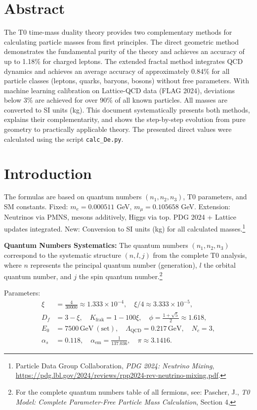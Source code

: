\section*{Abstract}
		The T0 time-mass duality theory provides two complementary methods for calculating particle masses from first principles. The direct geometric method demonstrates the fundamental purity of the theory and achieves an accuracy of up to 1.18\% for charged leptons. The extended fractal method integrates QCD dynamics and achieves an average accuracy of approximately 0.84\% for all particle classes (leptons, quarks, baryons, bosons) without free parameters. With machine learning calibration on Lattice-QCD data (FLAG 2024), deviations below 3\% are achieved for over 90\% of all known particles. All masses are converted to SI units (kg). This document systematically presents both methods, explains their complementarity, and shows the step-by-step evolution from pure geometry to practically applicable theory. The presented direct values were calculated using the script \texttt{calc\_De.py}.

	
	
	\section{Introduction}
	\label{sec:introduction}
	
	The formulas are based on quantum numbers $(n_1, n_2, n_3)$, T0 parameters, and SM constants. Fixed: $m_e = 0.000511$ GeV, $m_\mu = 0.105658$ GeV. Extension: Neutrinos via PMNS, mesons additively, Higgs via top. PDG 2024 + Lattice updates integrated. New: Conversion to SI units (kg) for all calculated masses.\footnote{Particle Data Group Collaboration, \emph{PDG 2024: Neutrino Mixing}, \url{https://pdg.lbl.gov/2024/reviews/rpp2024-rev-neutrino-mixing.pdf}.}
	
	\textbf{Quantum Numbers Systematics:} The quantum numbers $(n_1, n_2, n_3)$ correspond to the systematic structure $(n, l, j)$ from the complete T0 analysis, where $n$ represents the principal quantum number (generation), $l$ the orbital quantum number, and $j$ the spin quantum number.\footnote{For the complete quantum numbers table of all fermions, see: Pascher, J., \emph{T0 Model: Complete Parameter-Free Particle Mass Calculation}, Section 4, }
	
	Parameters:
	\begin{align}
		\xi &= \frac{4}{30000} \approx 1.333 \times 10^{-4}, \quad \xi/4 \approx 3.333 \times 10^{-5}, \nonumber \\
		D_f &= 3 - \xi, \quad K_{\text{frak}} = 1 - 100\xi, \quad \phi = \frac{1 + \sqrt{5}}{2} \approx 1.618, \nonumber \\
		E_0 &= 7500 \, \text{GeV}\ (\text{set}), \quad \Lambda_{\text{QCD}} = 0.217 \, \text{GeV}, \quad N_c = 3, \nonumber \\
		\alpha_s &= 0.118, \quad \alpha_{\text{em}} = \frac{1}{137.036}, \quad \pi \approx 3.1416.
	\end{align}

